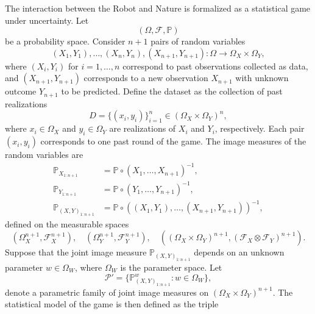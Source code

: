 \begin{definition}
	\label{def:statistical_game}
	The interaction between the Robot and Nature is formalized as a statistical game under uncertainty. Let
	\begin{equation}
		(\Omega, \mathcal{F}, \mathbb{P})
	\end{equation}
	be a probability space. Consider $n+1$ pairs of random variables
	\begin{equation}
		(X_1, Y_1), \dots, (X_n, Y_n), (X_{n+1}, Y_{n+1}) \colon \Omega \to \Omega_X \times \Omega_Y,
	\end{equation}
	where $(X_i,Y_i)$ for $i=1,\dots,n$ correspond to past observations collected as data, and $(X_{n+1},Y_{n+1})$ corresponds to a new observation $X_{n+1}$ with unknown outcome $Y_{n+1}$ to be predicted. Define the dataset as the collection of past realizations
	\begin{equation}
		D = \{(x_i, y_i)\}_{i=1}^n \in (\Omega_X \times \Omega_Y)^n,
	\end{equation}
	where $x_i \in \Omega_X$ and $y_i \in \Omega_Y$ are realizations of $X_i$ and $Y_i$, respectively. Each pair $(x_i, y_i)$ corresponds to one past round of the game. The image measures of the random variables are
	\begin{equation}
		\begin{split}
			\mathbb{P}_{X_{1:n+1}} &= \mathbb{P} \circ (X_1,\dots,X_{n+1})^{-1},\\
			\mathbb{P}_{Y_{1:n+1}} &= \mathbb{P} \circ (Y_1,\dots,Y_{n+1})^{-1},\\
			\mathbb{P}_{(X,Y)_{1:n+1}} &= \mathbb{P} \circ ((X_1,Y_1),\dots,(X_{n+1},Y_{n+1}))^{-1},
		\end{split}
	\end{equation}
	defined on the measurable spaces
	\begin{equation}
		(\Omega_X^{n+1},\mathcal{F}_X^{n+1}), \quad(\Omega_Y^{n+1},\mathcal{F}_Y^{n+1}), \quad ((\Omega_X \times \Omega_Y)^{n+1}, (\mathcal{F}_X \otimes \mathcal{F}_Y)^{n+1}).
	\end{equation}
	Suppose that the joint image measure $\mathbb{P}_{(X,Y)_{1:n+1}}$ depends on an unknown parameter $w \in \Omega_W$, where $\Omega_W$ is the parameter space. Let
	\begin{equation}
		\mathcal{P}' = \{ \mathbb{P}^w_{(X,Y)_{1:n+1}} \colon w \in \Omega_W \},
	\end{equation}
	denote a parametric family of joint image measures on $(\Omega_X \times \Omega_Y)^{n+1}$. The statistical model of the game is then defined as the triple

\end{definition}
